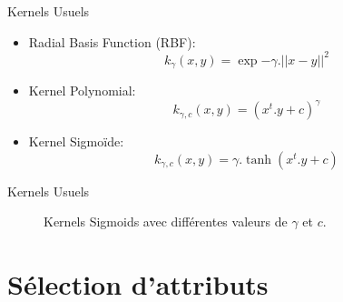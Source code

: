 \documentclass[8pt]{beamer}
\begin{document}
	\begin{frame}{Kernels Usuels}
		\begin{itemize}
			\item  Radial Basis Function (RBF):
			\begin{equation}
				k_{\gamma}(x,y) = \exp{-\gamma.\vert\vert x-y \vert\vert^2}
			\end{equation}
			\item  Kernel Polynomial:
			\begin{equation}
				k_{\gamma, c}(x,y) = (x^t.y + c)^{\gamma}
			\end{equation}
			\item  Kernel Sigmoïde:
			\begin{equation}
				k_{\gamma, c}(x,y) = \gamma.\tanh(x^t.y + c)
			\end{equation}
		\end{itemize}
	\end{frame}

	\begin{frame}[plain]{Kernels Usuels}
		\begin{figure}[H]
			{
				\caption*{}
			}
			{
				\caption*{Kernels Sigmoids avec différentes valeurs de $\gamma$ et $c$.}\label{fig::tanhs}
			}
		\end{figure}
	\end{frame}

	\section[feature selection]{Sélection d'attributs}
\end{document}
